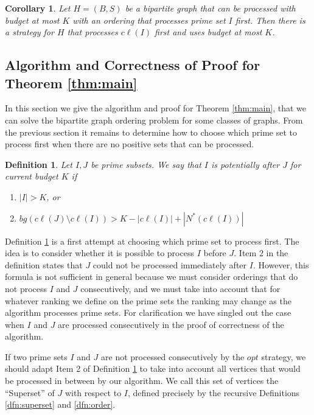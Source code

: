 \documentclass[letterpaper,11pt,abstracton]{scrartcl}
\newtheorem{cor}[theorem]{Corollary}
\newtheorem{dfn}[theorem]{Definition}
\begin{document}
\begin{cor}
  Let $H = (B, S)$ be a bipartite graph that can be processed with budget
  at most $K$ with an ordering that processes prime set $I$ first. Then
  there is a strategy for $H$ that processes $c\ell(I)$ first and uses budget
  at most $K$.
\end{cor}


\subsection{Algorithm and Correctness of Proof for Theorem \ref{thm:main}}\label{sec:main-pf}

In this section we give the algorithm and proof for Theorem \ref{thm:main}, that
we can solve the bipartite graph ordering problem for some classes of graphs. From the previous section it remains to determine how to choose
which prime set to process first when there are no positive sets that can be
processed.

\begin{dfn} \label{dfn:pre-order}
Let $I,J$ be prime subsets. We say that $I$ is {\em potentially after} $J$ for current budget $K$ if

\begin{enumerate}

 \item $|I|  > K$, or
\item
  $bg(c\ell(J)\setminus c\ell(I)) > K - |c\ell(I)| + |N^*(c\ell(I))|$
\end{enumerate}
\end{dfn}



Definition \ref{dfn:pre-order} is a first attempt at choosing which
prime set to process first. The idea is to consider whether it is
possible to process $I$ before $J$.  Item 2 in the definition states
that $J$ could not be processed immediately after $I$.  However, this
formula is not sufficient in general because we must consider
orderings that do not process $I$ and $J$ consecutively, and we must
take into account that for whatever ranking we define on the prime
sets the ranking may change as the algorithm processes prime sets.
For clarification we have singled out the case when $I$ and $J$ are
processed consecutively in the proof of correctness of the algorithm.

If two prime sets $I$ and $J$ are not processed consecutively by the
$opt$ strategy, we should adapt Item 2 of Definition
\ref{dfn:pre-order} to take into account all vertices that would be
processed in between by our algorithm.  We call this set of vertices
the ``Superset'' of $J$ with respect to $I$, defined precisely by the recursive
Definitions \ref{dfn:superset} and \ref{dfn:order}.
\end{document}
